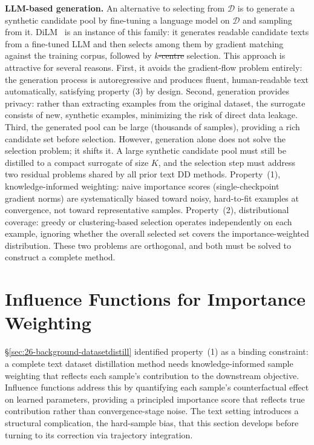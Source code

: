\documentclass[12pt, a4paper, twoside]{book}
\makeatletter
\numberwithin{equation}{chapter}
\theoremstyle{plain}
\theoremstyle{definition}
\theoremstyle{remark}
\newenvironment{foldable}{}{}
\providecommand{\DIFaddtex}[1]{{\protect\color{blue}\uwave{#1}}} %
\providecommand{\DIFdeltex}[1]{{\protect\color{red}\sout{#1}}} %
\providecommand{\DIFaddbegin}{} %
\providecommand{\DIFaddend}{} %
\providecommand{\DIFdelbegin}{} %
\providecommand{\DIFdelend}{} %
\providecommand{\DIFadd}[1]{\texorpdfstring{\DIFaddtex{#1}}{#1}} %
\providecommand{\DIFdel}[1]{\texorpdfstring{\DIFdeltex{#1}}{}} %
\newcommand{\DIFscaledelfig}{0.5}
\newlength{\DIFdelgraphicswidth} %
\newlength{\DIFdelgraphicsheight} %
\newcommand{\DIFaddincludegraphics}[2][]{{\color{blue}\fbox{\DIFOincludegraphics[#1]{#2}}}} %
\newcommand{\DIFdelincludegraphics}[2][]{%
\sbox{\DIFdelgraphicsbox}{\DIFOincludegraphics[#1]{#2}}%
\settoboxwidth{\DIFdelgraphicswidth}{\DIFdelgraphicsbox} %
\settoboxtotalheight{\DIFdelgraphicsheight}{\DIFdelgraphicsbox} %
\scalebox{\DIFscaledelfig}{%
\parbox[b]{\DIFdelgraphicswidth}{\usebox{\DIFdelgraphicsbox}\\[-\baselineskip] \rule{\DIFdelgraphicswidth}{0em}}\llap{\resizebox{\DIFdelgraphicswidth}{\DIFdelgraphicsheight}{%
\setlength{\unitlength}{\DIFdelgraphicswidth}%
\begin{picture}(1,1)%
\thicklines\linethickness{2pt} %
{\color[rgb]{1,0,0}\put(0,0){\framebox(1,1){}}}%
{\color[rgb]{1,0,0}\put(0,0){\line( 1,1){1}}}%
{\color[rgb]{1,0,0}\put(0,1){\line(1,-1){1}}}%
\end{picture}%
}\hspace*{3pt}}} %
} %
\DeclareRobustCommand{\DIFaddbegin}{\DIFOaddbegin \let\includegraphics\DIFaddincludegraphics} %
\DeclareRobustCommand{\DIFaddend}{\DIFOaddend \let\includegraphics\DIFOincludegraphics} %
\DeclareRobustCommand{\DIFdelbegin}{\DIFOdelbegin \let\includegraphics\DIFdelincludegraphics} %
\DeclareRobustCommand{\DIFdelend}{\DIFOaddend \let\includegraphics\DIFOincludegraphics} %
\let\sout@orig\sout %
\renewcommand{\sout}[1]{\ifmmode\text{\sout@orig{\ensuremath{#1}}}\else\sout@orig{#1}\fi} %
\makeatother
\begin{document}
\begin{foldable}
  \textbf{\ac{LLM}-based generation.}
  An alternative to selecting from $\mathcal{D}$ is to generate a synthetic candidate pool by fine-tuning a language model on $\mathcal{D}$ and sampling from it.
  DiLM~\cite{maekawa2024dilm} is an instance of this family: it generates readable candidate texts from a fine-tuned \ac{LLM} and then selects among them by gradient matching against the training corpus, followed by $k$\DIFdelbegin \DIFdel{-centre }\DIFdelend \DIFaddbegin \DIFadd{-center }\DIFaddend selection.
  This approach is attractive for several reasons.
  First, it avoids the gradient-flow problem entirely: the generation process is autoregressive and produces fluent, human-readable text automatically, satisfying property (3) by design.
  Second, generation provides privacy: rather than extracting examples from the original dataset, the surrogate consists of new, synthetic examples, minimizing the risk of direct data leakage.
  Third, the generated pool can be large (thousands of samples), providing a rich candidate set before selection.
  However, generation alone does not solve the selection problem; it shifts it.
  A large synthetic candidate pool must still be distilled to a compact surrogate of size $K$, and the selection step must address two residual problems shared by all prior text \ac{DD} methods.
  Property~(1), knowledge-informed weighting: naive importance scores (single-checkpoint gradient norms) are systematically biased toward noisy, hard-to-fit examples at convergence, not toward representative samples.
  Property~(2), distributional coverage: greedy or clustering-based selection operates independently on each example, ignoring whether the overall selected set covers the importance-weighted distribution.
  These two problems are orthogonal, and both must be solved to construct a complete method.
\end{foldable}
 \section{Influence Functions for Importance Weighting} \label{sec:27-background-influence}

\S\ref{sec:26-background-datasetdistill} identified property~(1) as a binding constraint: a complete text dataset distillation method needs knowledge-informed sample weighting that reflects each sample's contribution to the downstream objective.
Influence functions address this by quantifying each sample's counterfactual effect on learned parameters, providing a principled importance score that reflects true contribution rather than convergence-stage noise.
The text setting introduces a structural complication, the hard-sample bias, that this section develops before turning to its correction via trajectory integration.
\end{document}

